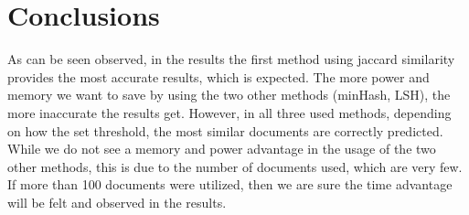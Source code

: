 \documentclass[a4paper, 11pt]{article}
\begin{document}
\section{Conclusions}

As can be seen observed, in the results the first method using jaccard similarity provides the most accurate results, which is expected. The more power and memory we want to save by using the two other methods (minHash, LSH), the more inaccurate the results get. However, in all three used methods, depending on how the set threshold, the most similar documents are correctly predicted. While we do not see a memory and power advantage in the usage of the two other methods, this is due to the number of documents used, which are very few. If more than 100 documents were utilized, then we are sure the time advantage will be felt and observed in the results.
\end{document}
